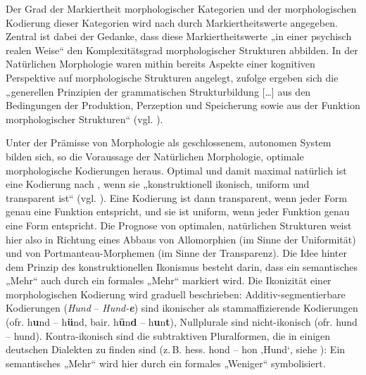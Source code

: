 Der Grad der Markiertheit morphologischer Kategorien und der morphologischen Kodierung dieser Kategorien wird nach \citet[10]{Mayerthaler1981} durch Markiertheitswerte angegeben. Zentral ist dabei der Gedanke, dass diese Markiertheitswerte „in einer psychisch realen Weise“ \citep[8]{Mayerthaler1981} den Komplexitätsgrad morphologischer Strukturen abbilden. In der Natürlichen Morphologie waren mithin bereits Aspekte einer kognitiven Perspektive auf morphologische Strukturen angelegt, \citet[187]{Wurzel1984} zufolge ergeben sich die „generellen Prinzipien der grammatischen Strukturbildung [\ldots] aus den Bedingungen der Produktion, Perzeption und Speicherung sowie aus der Funktion morphologischer Strukturen“ (vgl. \citealt[175]{HarnischRowley1990}).

Unter der Prämisse von Morphologie als geschlossenem, autonomen System bilden sich, so die Voraussage der Natürlichen Morphologie, optimale morphologische Kodierungen heraus. Optimal und damit maximal natürlich ist eine Kodierung nach \citet[22]{Mayerthaler1981}, wenn sie „konstruktionell ikonisch, uniform und transparent ist“ (vgl. \citealt[56]{Wurzel1994}). Eine Kodierung ist dann transparent, wenn jeder Form genau eine Funktion entspricht, und sie ist uniform, wenn jeder Funktion genau eine Form entspricht. Die Prognose von optimalen, natürlichen Strukturen weist hier also in Richtung eines Abbaus von Allomorphien (im Sinne der Uniformität) und von Portmanteau-Morphemen (im Sinne der Transparenz). Die Idee hinter dem Prinzip des konstruktionellen Ikonismus besteht darin, dass ein semantisches „Mehr“ auch durch ein formales „Mehr“ markiert wird. Die Ikonizität einer morphologischen Kodierung wird graduell beschrieben: Additiv-segmentierbare Kodierungen (\textit{Hund} -- \textit{Hund-}\textbf{\textit{e}}) sind ikonischer als stamm\-affizierende Kodierungen (ofr. h\textbf{u}nd -- h\textbf{ü}nd, bair. h\textbf{ū}n\textbf{d} -- h\textbf{u}n\textbf{t}), Nullplurale sind nicht-ikonisch (ofr. hund -- hund). Kontra-ikonisch sind die subtraktiven Pluralformen, die in einigen deutschen Dialekten zu finden sind (z.\,B. hess. hond -- hon ‚Hund‘, siehe ): Ein semantisches „Mehr“ wird hier durch ein formales „Weniger“ symbolisiert.

